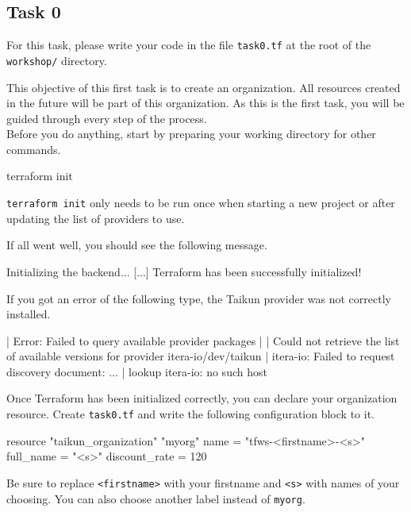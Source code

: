 \subsection{Task 0}\label{sec:task0}

\begin{note}
For this task, please write your code in the file \texttt{task0.tf}
at the root of the \texttt{workshop/} directory.
\end{note}

This objective of this first task is to create an organization.
All resources created in the future will be part of this organization.
As this is the first task, you will be guided through every step of the process.\\

Before you do anything, start by preparing your working directory for other commands.
\begin{shell}
terraform init
\end{shell}
\begin{tip}
\texttt{terraform init} only needs to be run once when starting a new project or after updating
the list of providers to use.
\end{tip}
If all went well, you should see the following message.
\begin{raw}
Initializing the backend...
[...]
Terraform has been successfully initialized!
\end{raw}
If you got an error of the following type, the Taikun provider was not correctly installed.
\begin{raw}
| Error: Failed to query available provider packages
|
| Could not retrieve the list of available versions for provider itera-io/dev/taikun
| itera-io: Failed to request discovery document: ...
| lookup itera-io: no such host
\end{raw}

Once Terraform has been initialized correctly, you can declare your organization resource.
Create \texttt{task0.tf} and write the following configuration block to it.
\begin{tf}
resource "taikun_organization" "myorg" {
  name          = "tfws-<firstname>-<s>"
  full_name     = "<s>"
  discount_rate = 120
}
\end{tf}
Be sure to replace \texttt{<firstname>} with your firstname and \texttt{<s>} with
names of your choosing. You can also choose another label instead of \texttt{myorg}.

